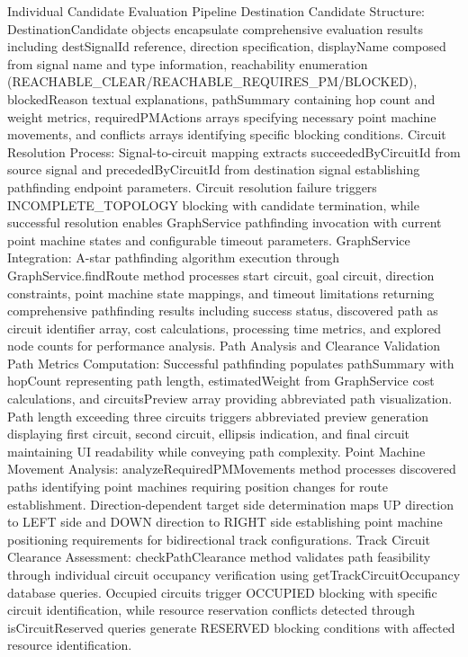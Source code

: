 Individual Candidate Evaluation Pipeline
Destination Candidate Structure: DestinationCandidate objects encapsulate comprehensive evaluation results including destSignalId reference, direction specification, displayName composed from signal name and type information, reachability enumeration (REACHABLE_CLEAR/REACHABLE_REQUIRES_PM/BLOCKED), blockedReason textual explanations, pathSummary containing hop count and weight metrics, requiredPMActions arrays specifying necessary point machine movements, and conflicts arrays identifying specific blocking conditions.
Circuit Resolution Process: Signal-to-circuit mapping extracts succeededByCircuitId from source signal and precededByCircuitId from destination signal establishing pathfinding endpoint parameters. Circuit resolution failure triggers INCOMPLETE_TOPOLOGY blocking with candidate termination, while successful resolution enables GraphService pathfinding invocation with current point machine states and configurable timeout parameters.
GraphService Integration: A-star pathfinding algorithm execution through GraphService.findRoute method processes start circuit, goal circuit, direction constraints, point machine state mappings, and timeout limitations returning comprehensive pathfinding results including success status, discovered path as circuit identifier array, cost calculations, processing time metrics, and explored node counts for performance analysis.
Path Analysis and Clearance Validation
Path Metrics Computation: Successful pathfinding populates pathSummary with hopCount representing path length, estimatedWeight from GraphService cost calculations, and circuitsPreview array providing abbreviated path visualization. Path length exceeding three circuits triggers abbreviated preview generation displaying first circuit, second circuit, ellipsis indication, and final circuit maintaining UI readability while conveying path complexity.
Point Machine Movement Analysis: analyzeRequiredPMMovements method processes discovered paths identifying point machines requiring position changes for route establishment. Direction-dependent target side determination maps UP direction to LEFT side and DOWN direction to RIGHT side establishing point machine positioning requirements for bidirectional track configurations.
Track Circuit Clearance Assessment: checkPathClearance method validates path feasibility through individual circuit occupancy verification using getTrackCircuitOccupancy database queries. Occupied circuits trigger OCCUPIED blocking with specific circuit identification, while resource reservation conflicts detected through isCircuitReserved queries generate RESERVED blocking conditions with affected resource identification.
